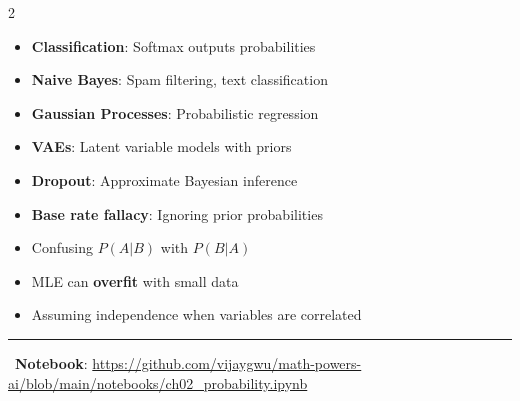 \documentclass[11pt,letterpaper]{article}
\begin{document}
\begin{multicols}{2}
\begin{center}
\end{center}

\begin{tcolorbox}[appbox, title={\faRobot\ ML Applications}]
\begin{itemize}
    \item \textbf{Classification}: Softmax outputs probabilities
    \item \textbf{Naive Bayes}: Spam filtering, text classification
    \item \textbf{Gaussian Processes}: Probabilistic regression
    \item \textbf{VAEs}: Latent variable models with priors
    \item \textbf{Dropout}: Approximate Bayesian inference
\end{itemize}
\end{tcolorbox}

\begin{tcolorbox}[warningbox, title={\faExclamationTriangle\ Common Pitfalls}]
\begin{itemize}
    \item \textbf{Base rate fallacy}: Ignoring prior probabilities
    \item Confusing $P(A|B)$ with $P(B|A)$
    \item MLE can \textbf{overfit} with small data
    \item Assuming independence when variables are correlated
\end{itemize}
\end{tcolorbox}

\end{multicols}

\vspace{5pt}
\hrule
\vspace{5pt}

\begin{center}
\faGithub\ \textbf{Notebook}: \url{https://github.com/vijaygwu/math-powers-ai/blob/main/notebooks/ch02_probability.ipynb}
\end{center}
\end{document}
